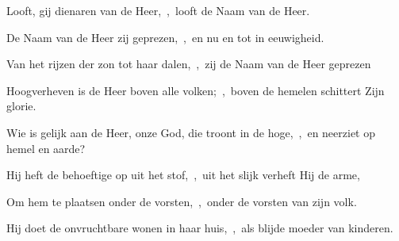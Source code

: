 \documentclass[12pt,twoside,a5paper]{article}
\begin{document}
\begin{halfparskip}
  Looft, gij dienaren van de Heer,~\sep\ looft de Naam van de Heer.


  De Naam van de Heer zij geprezen,~\sep\ en nu en tot in eeuwigheid.

  Van het rijzen der zon tot haar dalen,~\sep\ zij de Naam van de Heer geprezen

  Hoogverheven is de Heer boven alle volken;~\sep\ boven de hemelen schittert Zijn glorie.

  Wie is gelijk aan de Heer, onze God, die troont in de hoge,~\sep\ en neerziet op hemel en aarde?

  Hij heft de behoeftige op uit het stof,~\sep\ uit het slijk verheft Hij de arme,

  Om hem te plaatsen onder de vorsten,~\sep\ onder de vorsten van zijn volk.

  Hij doet de onvruchtbare wonen in haar huis,~\sep\ als blijde moeder van kinderen.
\end{halfparskip}

\end{document}
